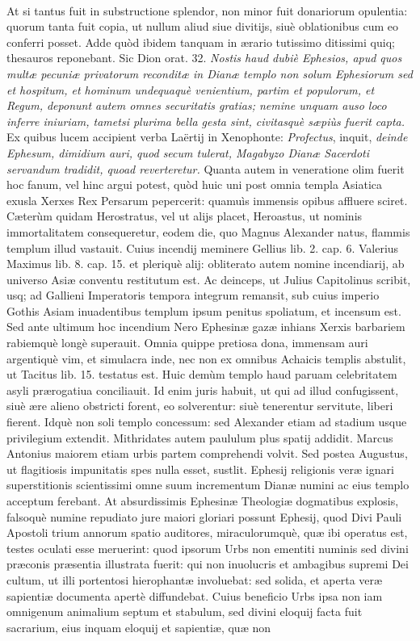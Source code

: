 \documentclass[a4paper, 11pt, oneside, polutonikogreek, latin]{article}
\begin{document}
\paragraph{}
At si tantus fuit in substructione splendor, non minor fuit donariorum opulentia: quorum tanta fuit copia, ut nullum aliud siue divitijs, siuè oblationibus cum eo conferri posset. Adde quòd ibidem tanquam in ærario tutissimo ditissimi quiq; thesauros reponebant. Sic Dion orat. 32. \emph{Nostis haud dubiè Ephesios, apud quos multæ pecuniæ privatorum reconditæ in Dianæ templo non solum Ephesiorum sed et hospitum, et hominum undequaquè venientium, partim et populorum, et Regum, deponunt autem omnes securitatis gratias; nemine unquam auso loco inferre iniuriam, tametsi plurima bella gesta sint, civitasquè sæpiùs fuerit capta.} Ex quibus lucem accipient verba Laërtij in Xenophonte: \emph{Profectus}, inquit, \emph{deinde Ephesum, dimidium auri, quod secum tulerat, Magabyzo Dianæ Sacerdoti servandum tradidit, quoad reverteretur.} Quanta autem in veneratione olim fuerit hoc fanum, vel hinc argui potest, quòd huic uni post omnia templa Asiatica exusla Xerxes Rex Persarum pepercerit: quamuìs immensis opibus affluere sciret. Cæterùm quidam Herostratus, vel ut alijs placet, Heroastus, ut nominis immortalitatem consequeretur, eodem die, quo Magnus Alexander natus, flammis templum illud vastauit. Cuius incendij meminere Gellius lib. 2. cap. 6. Valerius Maximus lib. 8. cap. 15. et pleriquè alij: obliterato autem nomine incendiarij, ab universo Asiæ conventu restitutum est. Ac deinceps, ut Julius Capitolinus scribit, usq; ad Gallieni Imperatoris tempora integrum remansit, sub cuius imperio Gothis Asiam inuadentibus templum ipsum penitus spoliatum, et incensum est. Sed ante ultimum hoc incendium Nero Ephesinæ gazæ inhians Xerxis barbariem rabiemquè longè superauit. Omnia quippe pretiosa dona, immensam auri argentiquè vim, et simulacra inde, nec non ex omnibus Achaicis templis abstulit, ut Tacitus lib. 15. testatus est. Huic demùm templo haud paruam celebritatem asyli prærogatiua conciliauit. Id enim juris habuit, ut qui ad illud confugissent, siuè ære alieno obstricti forent, eo solverentur: siuè tenerentur servitute, liberi fierent. Idquè non soli templo concessum: sed Alexander etiam ad stadium usque privilegium extendit. Mithridates autem paululum plus spatij addidit. Marcus Antonius maiorem etiam urbis partem comprehendi volvit. Sed postea Augustus, ut flagitiosis impunitatis spes nulla esset, sustlit. Ephesij religionis veræ ignari superstitionis scientissimi omne suum incrementum Dianæ numini ac eius templo acceptum ferebant. At absurdissimis Ephesinæ Theologiæ dogmatibus explosis, falsoquè numine repudiato jure maiori gloriari possunt Ephesij, quod Divi Pauli Apostoli trium annorum spatio auditores, miraculorumquè, quæ ibi operatus est, testes oculati esse meruerint: quod ipsorum Urbs non ementiti numinis sed divini præconis præsentia illustrata fuerit: qui non inuolucris et ambagibus supremi Dei cultum, ut illi portentosi hierophantæ involuebat: sed solida, et aperta veræ sapientiæ documenta apertè diffundebat. Cuius beneficio Urbs ipsa non iam omnigenum animalium septum et stabulum, sed divini eloquij facta fuit sacrarium, eius inquam eloquij et sapientiæ, quæ non 
\end{document}
